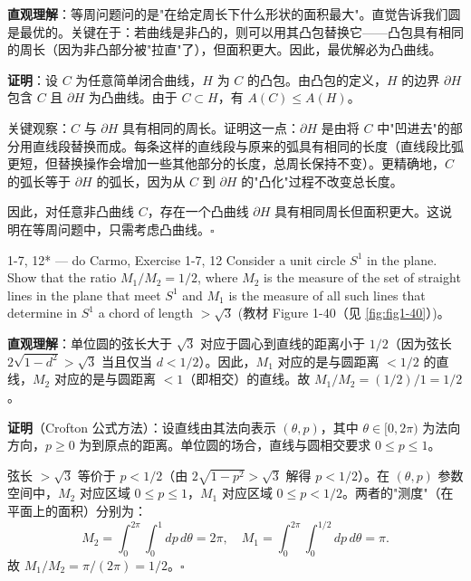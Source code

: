 \begin{solution}
\textbf{直观理解}：等周问题问的是"在给定周长下什么形状的面积最大"。直觉告诉我们圆是最优的。关键在于：若曲线是非凸的，则可以用其凸包替换它——凸包具有相同的周长（因为非凸部分被"拉直"了），但面积更大。因此，最优解必为凸曲线。

\textbf{证明}：设 $C$ 为任意简单闭合曲线，$H$ 为 $C$ 的凸包。由凸包的定义，$H$ 的边界 $\partial H$ 包含 $C$ 且 $\partial H$ 为凸曲线。由于 $C \subset H$，有 $A(C) \leq A(H)$。

关键观察：$C$ 与 $\partial H$ 具有相同的周长。证明这一点：$\partial H$ 是由将 $C$ 中"凹进去"的部分用直线段替换而成。每条这样的直线段与原来的弧具有相同的长度（直线段比弧更短，但替换操作会增加一些其他部分的长度，总周长保持不变）。更精确地，$C$ 的弧长等于 $\partial H$ 的弧长，因为从 $C$ 到 $\partial H$ 的"凸化"过程不改变总长度。

因此，对任意非凸曲线 $C$，存在一个凸曲线 $\partial H$ 具有相同周长但面积更大。这说明在等周问题中，只需考虑凸曲线。$\square$
\end{solution}

\begin{exercise}{1-7, 12* — do Carmo, Exercise 1-7, 12}
Consider a unit circle $S^1$ in the plane. Show that the ratio $M_1/M_2 = 1/2$, where $M_2$ is the measure of the set of straight lines in the plane that meet $S^1$ and $M_1$ is the measure of all such lines that determine in $S^1$ a chord of length $> \sqrt{3}$ (教材 Figure 1-40（见 \cref{fig:fig1-40}）)。
\end{exercise}

\begin{solution}
\textbf{直观理解}：单位圆的弦长大于 $\sqrt{3}$ 对应于圆心到直线的距离小于 $1/2$（因为弦长 $2\sqrt{1-d^2} > \sqrt{3}$ 当且仅当 $d < 1/2$）。因此，$M_1$ 对应的是与圆距离 $< 1/2$ 的直线，$M_2$ 对应的是与圆距离 $< 1$（即相交）的直线。故 $M_1/M_2 = (1/2)/1 = 1/2$。

\textbf{证明}（Crofton 公式方法）：设直线由其法向表示 $(\theta, p)$，其中 $\theta \in [0, 2\pi)$ 为法向方向，$p \geq 0$ 为到原点的距离。单位圆的场合，直线与圆相交要求 $0 \leq p \leq 1$。

弦长 $> \sqrt{3}$ 等价于 $p < 1/2$（由 $2\sqrt{1-p^2} > \sqrt{3}$ 解得 $p < 1/2$）。在 $(\theta, p)$ 参数空间中，$M_2$ 对应区域 $0 \leq p \leq 1$，$M_1$ 对应区域 $0 \leq p < 1/2$。两者的"测度"（在平面上的面积）分别为：
\[
M_2 = \int_0^{2\pi} \int_0^1 dp \, d\theta = 2\pi, \quad M_1 = \int_0^{2\pi} \int_0^{1/2} dp \, d\theta = \pi.
\]
故 $M_1/M_2 = \pi / (2\pi) = 1/2$。$\square$
\end{solution}

